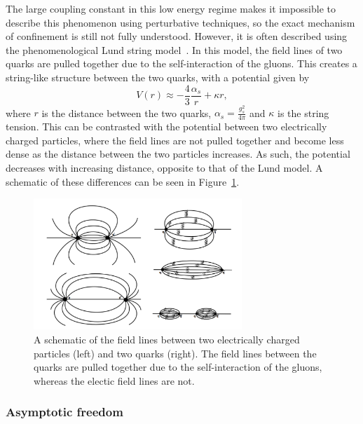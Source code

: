The large coupling constant in this low energy regime makes it impossible to describe this phenomenon using perturbative techniques, so the exact mechanism of confinement is still not fully understood. However, it is often described using the phenomenological Lund string model~\cite{LundString}. In this model, the field lines of two quarks are pulled together due to the self-interaction of the gluons. This creates a string-like structure between the two quarks, with a potential given by 
%
\begin{equation}
    \label{eq:lund_potential}
    V(r) \approx -\frac{4}{3}\frac{\alpha_s}{r} + \kappa r,
\end{equation}
%
where $r$ is the distance between the two quarks, $\alpha_s = \frac{g_s^2}{4\pi}$ and $\kappa$ is the string tension. This can be contrasted with the potential between two electrically charged particles, where the field lines are not pulled together and become less dense as the distance between the two particles increases. As such, the potential decreases with increasing distance, opposite to that of the Lund model. A schematic of these differences can be seen in Figure~\ref{fig:field_line_differences}.

\begin{figure}[ht]
    \centering
    \includegraphics[width=0.7\textwidth]{figures/introduction/electric_color_fields.png}
    \caption{A schematic of the field lines between two electrically charged particles (left) and two quarks (right). The field lines between the quarks are pulled together due to the self-interaction of the gluons, whereas the electic field lines are not.}
    \label{fig:field_line_differences}
\end{figure}

\subsubsection{Asymptotic freedom}
\label{sec:qcd_asymptotic_freedom}

